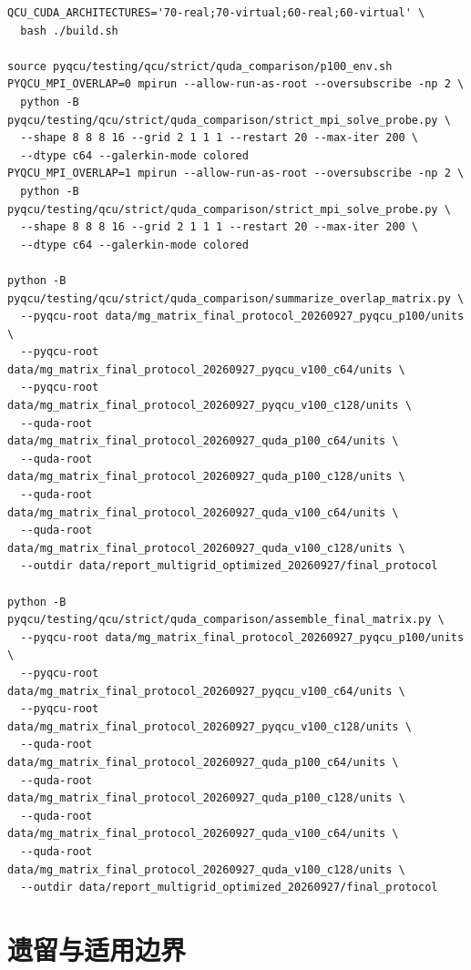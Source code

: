 \documentclass[UTF8,a4paper,11pt]{ctexart}
\begin{document}
\begin{lstlisting}[basicstyle=\ttfamily\small,breaklines=true]
QCU_CUDA_ARCHITECTURES='70-real;70-virtual;60-real;60-virtual' \
  bash ./build.sh

source pyqcu/testing/qcu/strict/quda_comparison/p100_env.sh
PYQCU_MPI_OVERLAP=0 mpirun --allow-run-as-root --oversubscribe -np 2 \
  python -B pyqcu/testing/qcu/strict/quda_comparison/strict_mpi_solve_probe.py \
  --shape 8 8 8 16 --grid 2 1 1 1 --restart 20 --max-iter 200 \
  --dtype c64 --galerkin-mode colored
PYQCU_MPI_OVERLAP=1 mpirun --allow-run-as-root --oversubscribe -np 2 \
  python -B pyqcu/testing/qcu/strict/quda_comparison/strict_mpi_solve_probe.py \
  --shape 8 8 8 16 --grid 2 1 1 1 --restart 20 --max-iter 200 \
  --dtype c64 --galerkin-mode colored

python -B pyqcu/testing/qcu/strict/quda_comparison/summarize_overlap_matrix.py \
  --pyqcu-root data/mg_matrix_final_protocol_20260927_pyqcu_p100/units \
  --pyqcu-root data/mg_matrix_final_protocol_20260927_pyqcu_v100_c64/units \
  --pyqcu-root data/mg_matrix_final_protocol_20260927_pyqcu_v100_c128/units \
  --quda-root data/mg_matrix_final_protocol_20260927_quda_p100_c64/units \
  --quda-root data/mg_matrix_final_protocol_20260927_quda_p100_c128/units \
  --quda-root data/mg_matrix_final_protocol_20260927_quda_v100_c64/units \
  --quda-root data/mg_matrix_final_protocol_20260927_quda_v100_c128/units \
  --outdir data/report_multigrid_optimized_20260927/final_protocol

python -B pyqcu/testing/qcu/strict/quda_comparison/assemble_final_matrix.py \
  --pyqcu-root data/mg_matrix_final_protocol_20260927_pyqcu_p100/units \
  --pyqcu-root data/mg_matrix_final_protocol_20260927_pyqcu_v100_c64/units \
  --pyqcu-root data/mg_matrix_final_protocol_20260927_pyqcu_v100_c128/units \
  --quda-root data/mg_matrix_final_protocol_20260927_quda_p100_c64/units \
  --quda-root data/mg_matrix_final_protocol_20260927_quda_p100_c128/units \
  --quda-root data/mg_matrix_final_protocol_20260927_quda_v100_c64/units \
  --quda-root data/mg_matrix_final_protocol_20260927_quda_v100_c128/units \
  --outdir data/report_multigrid_optimized_20260927/final_protocol
\end{lstlisting}

\section{遗留与适用边界}
\end{document}
